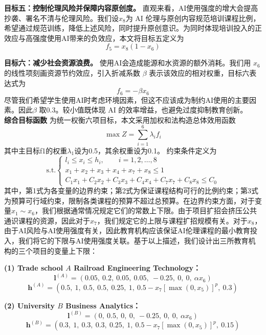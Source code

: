 \documentclass{mcmthesis}
\begin{document}
\noindent\textbf{目标五：控制伦理风险并保障内容原创度。}
直观来看，AI使用强度的增大会提高抄袭、署名不清与伦理风险。我们设$x_8$为 AI 伦理与原创内容规范培训课程比例，希望通过规范训练，降低上述风险，同时提升原创意识。为同时体现培训投入的正效应与高强度使用AI带来的负效应，本文将目标五定义为
\begin{equation}
f_5=x_8(1-x_6)
\end{equation}

\noindent\textbf{目标六：减少社会资源浪费。}
使用AI会造成能源和水资源的额外消耗。我们用 $x_6$ 的线性项刻画资源节约效应，引入折减系数 $\beta$ 表示该效应的相对权重，目标六表达式为
\begin{equation}
f_6=-\beta x_6
\end{equation}
尽管我们希望学生使用AI时考虑环境因素，但这不应该成为制约AI使用的主要因素。因此$\beta$ 取0.3。较小值既体现 AI 的效率增益，也避免过度抑制教育创新。\\

\noindent\textbf{综合目标函数}
为统一权衡六项目标，本文采用加权和法构造总体效用函数
\begin{equation}
\max Z=\sum_{i=1}^{6}\lambda_i f_i
\end{equation}
其中主目标f1的权重$\lambda_1$设为0.5，其余权重设为0.1。
约束条件定义为
\begin{equation}
\text{s.t.}
\begin{cases}
l_i\le x_i\le h_i,\qquad i=1,2,\dots,8 \\
x_1+x_2+x_3+x_4+x_7+x_8\le 1\\
C_1x_1+C_2x_2+C_3x_3+C_4x_4+C_7x_7+C_8x_8\le C_0
\end{cases}
\end{equation}
\noindent 其中，第1式为各变量的边界约束；第2式为保证课程结构可行的比例约束；第3式为预算可行域约束，限制各类课程的预算不超过总预算。在边界约束方面，对于变量$x_1\sim x_6$，我们根据通常情况规定它们的常数上下限。由于项目扩招会挤压公共通识课程的资源，因此对于$x_7$，我们规定它的上限与课程扩招规模有关。对于$x_8$，由于AI风险与AI使用强度有关，因此教育机构应该保证AI伦理课程的最小教育投入，我们将它的下限与AI使用强度关联。基于以上描述，我们设计出三所教育机构的三个项目的变量上下限：

\medskip
\noindent\textbf{(1) Trade school $A$ Railroad Engineering Technology：}
\[
\mathbf{l}^{(A)}=
(0.05,\ 0.2,\ 0.05,\ 0.05,\ -0.25,\ 0,\ 0,\ \alpha x_6)
\]
\[
\mathbf{h}^{(A)}=
(0.5,\ 1,\ 0.5,\ 0.5,\ 0.25,\ 1,\ 0.5-x_7[\max(0,x_5)]^{p},\ 0.3)
\]

\medskip
\noindent\textbf{(2) University $B$ Business Analytics：}
\[
\mathbf{l}^{(B)}=
(0,\ 0.5,\ 0,\ 0,\ -0.25,\ 0,\ 0,\ \alpha x_6)
\]
\[
\mathbf{h}^{(B)}=
(0.3,\ 1,\ 0.3,\ 0.3,\ 0.25,\ 1,\ 0.5-x_7[\max(0,x_5)]^{p},\ 0.15)
\]
\end{document}
